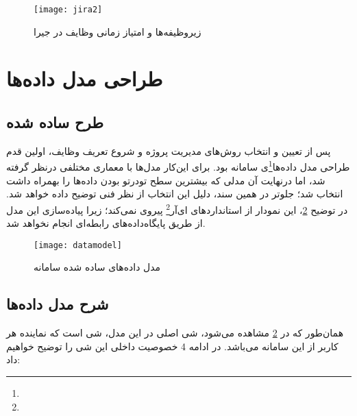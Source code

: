 \begin{figure}[H]
	\centering
	\texttt{[image: jira2]}
	\caption{زیروظیفه‌ها و امتیاز زمانی وظایف در جیرا}
	\label{fig:jira2}
\end{figure}

\section{طراحی مدل داده‌ها}

\subsection{طرح ساده شده}

پس از تعیین و انتخاب روش‌های مدیریت پروژه و شروع تعریف وظایف، اولین قدم طراحی مدل داده‌ها\footnote{}ی سامانه بود. برای این‌کار مدل‌ها با معماری مختلفی درنظر گرفته شد، اما درنهایت آن مدلی که بیشترین سطح تودرتو بودن داده‌ها را بهمراه داشت انتخاب شد؛ جلوتر در همین سند، دلیل این انتخاب از نظر فنی توضیح داده خواهد شد. در توضیح \cref{fig:datamodel}، این نمودار از استانداردهای ای‌آر\footnote{} پیروی نمی‌کند؛ زیرا پیاده‌سازی این مدل از طریق پایگاه‌داده‌های رابطه‌ای انجام نخواهد شد.

\begin{figure}[H]
	\centering
	\texttt{[image: datamodel]}
	\caption{مدل داده‌های ساده شده سامانه}
	\label{fig:datamodel}
\end{figure}

\newpage

\subsection{شرح مدل داده‌ها}

همان‌طور که در \cref{fig:datamodel} مشاهده می‌شود، شی اصلی در این مدل، شی  است که نماینده هر کاربر از این سامانه می‌باشد. در ادامه 4 خصوصیت داخلی این شی را توضیح خواهیم داد:

